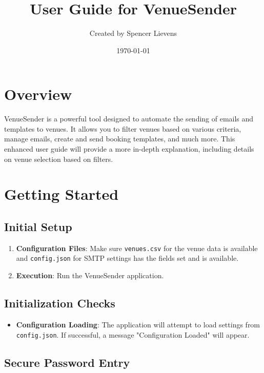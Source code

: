 \documentclass{article}
\title{\color{textcolor}User Guide for VenueSender}
\begin{document}
	
	\author{Created by Spencer Lievens}
	\date{\today}
	
	\maketitle
	
\section{Overview}

VenueSender is a powerful tool designed to automate the sending of emails and templates to venues. 
It allows you to filter venues based on various criteria, manage emails, create and send booking templates, 
and much more. This enhanced user guide will provide a more in-depth explanation, including details on venue 
selection based on filters.

\section{Getting Started}

\subsection{Initial Setup}

\begin{enumerate}
	\item \textbf{Configuration Files}: Make sure \texttt{venues.csv} for the venue data is available and \texttt{config.json} for SMTP settings has the fields set and is available.
	\item \textbf{Execution}: Run the VenueSender application.
\end{enumerate}

\subsection{Initialization Checks}

\begin{itemize}
	\item \textbf{Configuration Loading}: The application will attempt to load settings from \texttt{config.json}. If successful, a message "Configuration Loaded" will appear.
\end{itemize}

\subsection{Secure Password Entry}
\end{document}
